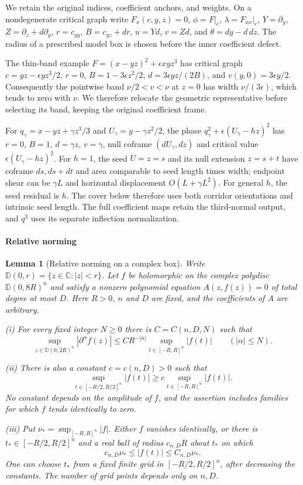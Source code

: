 \documentclass[11pt]{amsart}
\newtheorem{lemma}[theorem]{Lemma}
\theoremstyle{definition}
\theoremstyle{remark}
\numberwithin{equation}{section}
\begin{document}
We retain the original indices, coefficient anchors, and weights. On a nondegenerate critical graph write $F_x(c,y,z)=0$, $\phi=F|_c$, $\lambda=F_{xx}|_c$, $Y=\partial_y$, $Z=\partial_z+d\partial_y$, $r=c_{yy}$, $B=c_{yz}+dr$, $u=Yd$, $v=Zd$, and $\theta=dy-d\,dz$. The radius of a prescribed model box is chosen before the inner coefficient defect.

The thin-band example $F=(x-yz)^2+\epsilon xyz^3$ has critical graph $c=yz-\epsilon yz^3/2$, $r=0$, $B=1-3\epsilon z^2/2$, $d=3\epsilon yz/(2B)$, and $v(y,0)=3\epsilon y/2$. Consequently the pointwise band $\nu/2<v<\nu$ at $z=0$ has width $\nu/(3\epsilon)$, which tends to zero with $\nu$. We therefore relocate the geometric representative before selecting its band, keeping the original coefficient frame.

For $q_\gamma=x-yz+\gamma z^3/3$ and $U_\gamma=y-\gamma z^2/2$, the phase $q_\gamma^2+\epsilon(U_\gamma-hz)^2$ has $r=0$, $B=1$, $d=\gamma z$, $v=\gamma$, null coframe $(dU_\gamma,dz)$ and critical value $\epsilon(U_\gamma-hz)^2$. For $h=1$, the seed $U=z=s$ and its null extension $z=s+t$ have coframe $ds,ds+dt$ and area comparable to seed length times width; endpoint shear can be $\gamma L$ and horizontal displacement $O(L+\gamma L^2)$. For general $h$, the seed residual is $h$. The cover below therefore uses both corridor orientations and intrinsic seed length. The full coefficient maps retain the third-normal output, and $q^3$ uses its separate inflection normalization.

\paragraph{Relative norming}

\begin{lemma}[Relative norming on a complex box]\label{low:6:r3:norming}
Write $\mathbb D(0,r)=\{z\in\mathbb C:|z|<r\}$. Let $f$ be holomorphic on the complex polydisc $\mathbb D(0,8R)^n$ and satisfy a nonzero polynomial equation $A(z,f(z))=0$ of total degree at most $D$. Here $R>0$, $n$ and $D$ are fixed, and the coefficients of $A$ are arbitrary.

\noindent\textup{(i)} For every fixed integer $N\ge0$ there is $C=C(n,D,N)$ such that
\[
\sup_{z\in\mathbb D(0,2R)^n}|\partial^\alpha f(z)|\le C R^{-|\alpha|}\sup_{t\in[-R,R]^n}|f(t)|\qquad(|\alpha|\le N).
\]

\noindent\textup{(ii)} There is also a constant $c=c(n,D)>0$ such that
\[
\sup_{t\in[-R/2,R/2]^n}|f(t)|\ge c\sup_{t\in[-R,R]^n}|f(t)|.
\]
No constant depends on the amplitude of $f$, and the assertion includes families for which $f$ tends identically to zero.

\noindent\textup{(iii)} Put $\nu_* = \sup_{[-R,R]^n}|f|$. Either $f$ vanishes identically, or there is $t_*\in[-R/2,R/2]^n$ and a real ball of radius $c_{n,D}R$ about $t_*$ on which
\[
c_{n,D}\nu_*\le |f(t)|\le C_{n,D}\nu_*.
\]
One can choose $t_*$ from a fixed finite grid in $[-R/2,R/2]^n$, after decreasing the constants. The number of grid points depends only on $n,D$.
\end{lemma}
\end{document}
